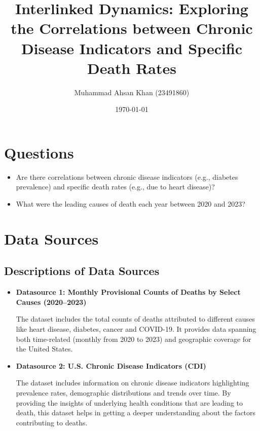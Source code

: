 \documentclass[a4paper,10pt]{article}
\title{Interlinked Dynamics: Exploring the Correlations between Chronic Disease Indicators and Specific Death Rates}
\author{Muhammad Ahsan Khan (23491860)}
\date{\today}
\begin{document}
	\maketitle
	
	\section{Questions}
		\begin{itemize}
			\item Are there correlations between chronic disease indicators (e.g., diabetes prevalence) and specific death rates (e.g., due to heart disease)?
			\item What were the leading causes of death each year between 2020 and 2023?
		\end{itemize}
	
	\section{Data Sources}
	\subsection{Descriptions of Data Sources}
	\begin{itemize}
		\item \textbf{Datasource 1: Monthly Provisional Counts of Deaths by Select Causes (2020--2023)}
		
		The dataset includes the total counts of deaths attributed to different causes like heart disease, diabetes, cancer and COVID-19. It provides data spanning both time-related (monthly from 2020 to 2023) and geographic coverage for the United States. \cite{dataset1}
	
	\end{itemize}

	\begin{itemize}
		\item \textbf{Datasource 2: U.S. Chronic Disease Indicators (CDI)} 
		
		The dataset includes information on chronic disease indicators highlighting prevalence rates, demographic distributions and trends over time. By providing the insights of underlying health conditions that are leading to death, this dataset helps in getting a deeper understanding about the factors contributing to deaths. \cite{dataset2}
		
	\end{itemize}
	
\end{document}
